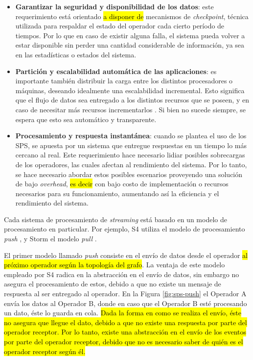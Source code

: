 \begin{itemize}
	\item \textbf{Garantizar la seguridad y disponibilidad de los datos}: este requerimiento está orientado \hl{a disponer de} mecanismos de \textit{checkpoint}, técnica utilizada para respaldar el estado del operador cada cierto período de tiempos. Por lo que en caso de existir alguna falla, el sistema pueda volver a estar disponible sin perder una cantidad considerable de información, ya sea en las estadísticas o estados del sistema.
	\item \textbf{Partición y escalabilidad automática de las aplicaciones}: es importante también distribuir la carga entre los distintos procesadores o máquinas, deseando idealmente una escalabilidad incremental. Esto significa que el flujo de datos sea entregado a los distintos recursos que se poseen, y en caso de necesitar más recursos incrementarlos \citep{bookTanenbaum}. Si bien no sucede siempre, se espera que esto sea automático y transparente.
	\item \textbf{Procesamiento y respuesta instantánea}: cuando se plantea el uso de los SPS, se apuesta por un sistema que entregue respuestas en un tiempo lo más cercano al real. Este requerimiento hace necesario lidiar posibles sobrecargas de los operadores, las cuales afectan al rendimiento del sistema. Por lo tanto, se hace necesario abordar estos posibles escenarios proveyendo una solución de bajo \textit{overhead}, \hl{es decir} con bajo costo de implementación o recursos necesarios para su funcionamiento, aumentando así la eficiencia y el rendimiento del sistema.
\end{itemize}

Cada sistema de procesamiento de \textsl{streaming} está basado en un modelo de procesamiento en particular. Por ejemplo, S4 utiliza el modelo de procesamiento \textsl{push} \citep{s4yahoo}, y Storm el modelo \textsl{pull} \citep{stormtwitter}.

El primer modelo llamado \textit{push} consiste en el envío de datos desde el operador \hl{al próximo operador según la topología del grafo}. La ventaja de este modelo empleado por S4 radica en la abstracción en el envío de datos, sin embargo no asegura el procesamiento de estos, debido a que no existe un mensaje de respuesta al ser entregado al operador. En la Figura \ref{fig:sps-push} el Operador A envía los datos al Operador B, donde en caso que el Operador B esté procesando un dato, éste lo guarda en cola. \hl{Dada la forma en como se realiza el envío, éste no asegura que llegue el dato, debido a que no existe una respuesta por parte del operador receptor. Por lo tanto, existe una abstracción en el envío de los eventos por parte del operador receptor, debido que no es necesario saber de quién es el operador receptor según él.}

